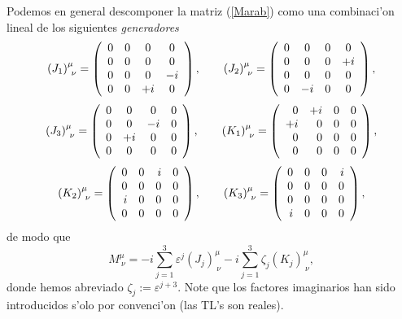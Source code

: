 Podemos en general descomponer la matriz (\ref{Marab}) como una combinaci'on
lineal de los siguientes \textit{generadores}
\begin{equation}
\left(J_1\right)^\mu_{\ \nu}     =\left(
\begin{array}
[c]{cccc}
0 & 0 & 0 & 0\\
0 & 0 & 0 & 0\\
0 & 0 & 0 & -i\\
0 & 0 & +i & 0
\end{array}
\right), \qquad
\left(J_2\right)^\mu_{\ \nu}=\left(\begin{array}
[c]{cccc}
0 & 0 & 0 & 0\\
0 & 0 & 0 & +i\\
0 & 0 & 0 & 0\\
0 & -i & 0 & 0
\end{array}
\right),
\end{equation}
\begin{equation}
\left(J_3\right)^\mu_{\ \nu}=\left(
\begin{array}
[c]{cccc}
0 & 0 & 0 & 0\\
0 & 0 & -i & 0\\
0 & +i & 0 & 0\\
0 & 0 & 0 & 0
\end{array}
\right), \qquad
\left(K_1\right)^\mu_{\ \nu} =\left(
\begin{array}
[c]{rrrr}
0 & +i & 0 & 0\\
+i & 0 & 0 & 0\\
0 & 0 & 0 & 0\\
0 & 0 & 0 & 0
\end{array}
\right) ,
\end{equation}
\begin{equation}
\left(K_2\right)^\mu_{\ \nu}=\left(
\begin{array}
[c]{rrrr}
0 & 0 & i & 0\\
0 & 0 & 0 & 0\\
i & 0 & 0 & 0\\
0 & 0 & 0 & 0
\end{array}
\right), \qquad
\left(K_3\right)^\mu_{\ \nu}=\left(
\begin{array}
[c]{rrrr}
0 & 0 & 0 & i\\
0 & 0 & 0 & 0\\
0 & 0 & 0 & 0\\
i & 0 & 0 & 0
\end{array}
\right),
\end{equation}
de modo que
\begin{equation}
M^\mu_{\ \nu}= -i\sum_{j=1}^3\varepsilon^j\left(J_j\right)^\mu_{\
\nu}-i\sum_{j=1}^3\zeta_j\left(K_j\right)^\mu_{\ \nu}, \label{M}
\end{equation}
donde hemos abreviado $\zeta_j:=\varepsilon^{j+3}$. Note que los factores
imaginarios han sido introducidos s'olo por convenci'on (las TL's son reales).


